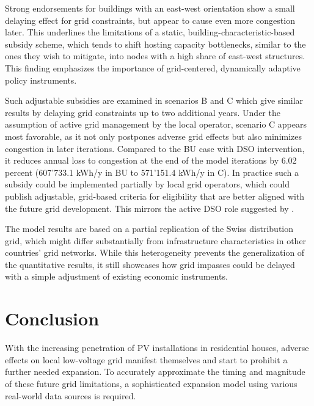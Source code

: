 \documentclass[12PT, ]{article}
\begin{document}
Strong endorsements for buildings with an east-west orientation show a small delaying effect for grid constraints, but appear to cause even more congestion later. This underlines the limitations of a static, building-characteristic-based subsidy scheme, which tends to shift hosting capacity bottlenecks, similar to the ones they wish to mitigate, into nodes with a high share of east-west structures. 
This finding emphasizes the importance of grid-centered, dynamically adaptive policy instruments. 

Such adjustable subsidies are examined in scenarios B and C which give similar results by delaying grid constraints up to two additional years. Under the assumption of active grid management by the local operator, scenario C appears most favorable, as it not only postpones adverse grid effects but also minimizes congestion in later iterations. Compared to the BU case with DSO intervention, it reduces annual loss to congestion at the end of the model iterations by 6.02 percent (607'733.1 kWh/y in BU to 571'151.4 kWh/y in C).
In practice such a subsidy could be implemented partially by local grid operators, which could publish adjustable, grid-based criteria for eligibility that are better aligned with the future grid development. This mirrors the active DSO role suggested by \cite{tevar2019}.

The model results are based on a partial replication of the Swiss distribution grid, which might differ substantially from infrastructure characteristics in other countries' grid networks. While this heterogeneity prevents the generalization of the quantitative results, it still showcases how grid impasses could be delayed with a simple adjustment of existing economic instruments. 


\section{Conclusion} \label{sec:conclusion}%
With the increasing penetration of PV installations in residential houses, adverse effects on local low-voltage grid manifest themselves and start to prohibit a further needed expansion. 
To accurately approximate the timing and magnitude of these future grid limitations, a sophisticated expansion model using various real-world data sources is required. 
\end{document}
